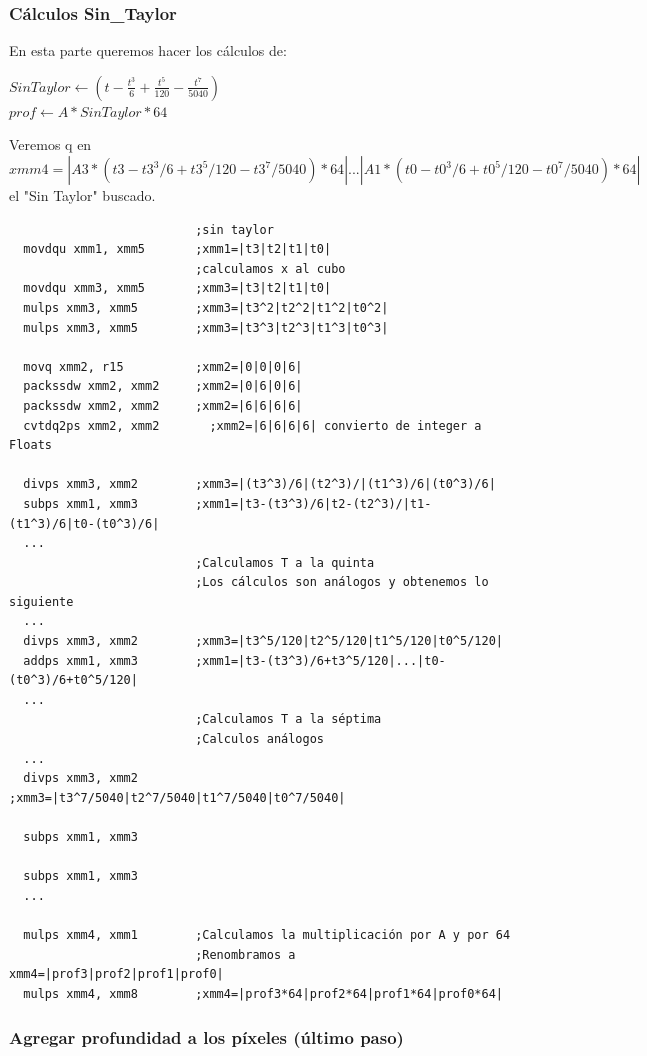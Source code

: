 \subsubsection*{Cálculos Sin_Taylor}
En esta parte queremos hacer los cálculos de:
\begin{center}
	$SinTaylor \gets (t - \frac{t^3}{6}+\frac{t^5}{120}-\frac{t^7}{5040})$ \\
	$prof \gets A * SinTaylor*64$
\end{center}
Veremos q en $xmm4=|A3*(t3-t3^3/6+t3^5/120-t3^7/5040)*64|...|A1*(t0-t0^3/6+t0^5/120-t0^7/5040)*64|$ el "Sin Taylor" buscado.
\begin{codesnippet}
\begin{verbatim}
                          ;sin taylor
  movdqu xmm1, xmm5       ;xmm1=|t3|t2|t1|t0|
                          ;calculamos x al cubo
  movdqu xmm3, xmm5       ;xmm3=|t3|t2|t1|t0|
  mulps xmm3, xmm5        ;xmm3=|t3^2|t2^2|t1^2|t0^2|
  mulps xmm3, xmm5        ;xmm3=|t3^3|t2^3|t1^3|t0^3|	

  movq xmm2, r15          ;xmm2=|0|0|0|6|
  packssdw xmm2, xmm2     ;xmm2=|0|6|0|6|
  packssdw xmm2, xmm2     ;xmm2=|6|6|6|6|
  cvtdq2ps xmm2, xmm2	    ;xmm2=|6|6|6|6| convierto de integer a Floats

  divps xmm3, xmm2        ;xmm3=|(t3^3)/6|(t2^3)/|(t1^3)/6|(t0^3)/6|
  subps xmm1, xmm3        ;xmm1=|t3-(t3^3)/6|t2-(t2^3)/|t1-(t1^3)/6|t0-(t0^3)/6|
  ...              
                          ;Calculamos T a la quinta
                          ;Los cálculos son análogos y obtenemos lo siguiente
  ...
  divps xmm3, xmm2        ;xmm3=|t3^5/120|t2^5/120|t1^5/120|t0^5/120|								
  addps xmm1, xmm3        ;xmm1=|t3-(t3^3)/6+t3^5/120|...|t0-(t0^3)/6+t0^5/120|								
  ...
                          ;Calculamos T a la séptima
                          ;Calculos análogos
  ...
  divps xmm3, xmm2        ;xmm3=|t3^7/5040|t2^7/5040|t1^7/5040|t0^7/5040|
                  
  subps xmm1, xmm3        

  subps xmm1, xmm3        
  ...

  mulps xmm4, xmm1        ;Calculamos la multiplicación por A y por 64
                          ;Renombramos a xmm4=|prof3|prof2|prof1|prof0|		
  mulps xmm4, xmm8        ;xmm4=|prof3*64|prof2*64|prof1*64|prof0*64|

\end{verbatim}
\end{codesnippet}

\subsubsection*{Agregar profundidad a los píxeles (último paso)}

